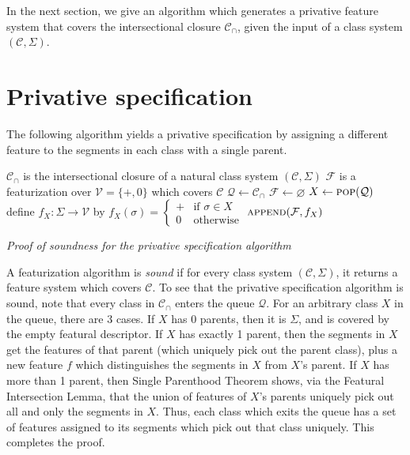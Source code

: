 \documentclass[11pt, oneside]{article}   	%
\begin{document}
In the next section, we give an algorithm which generates a privative feature system that covers the intersectional closure $\mathcal C_\cap$, given the input of a class system $(\mathcal C, \Sigma)$.

 \section{Privative specification}

The following algorithm yields a privative specification by assigning a different feature  to the segments in each class with a single parent.
 
\noindent \begin{algorithmic}
    \REQUIRE $\mathcal C_\cap$ is the intersectional closure of a natural class system $(\mathcal C, \Sigma)$
    \ENSURE $\mathcal F$ is a featurization over $\mathcal V = \{ +, 0 \}$ which covers $\mathcal C$
    \STATE
    \STATE $\mathcal Q \leftarrow \mathcal C_\cap$
    \STATE $\mathcal F \leftarrow \varnothing$
    \STATE
        \STATE $X \leftarrow \textsc{pop}(\mathcal Q)$
            \STATE define $f_X : \Sigma \rightarrow \mathcal V$ by $f_X(\sigma) = \begin{cases}
                + & \mbox{if } \sigma \in X \\
                0 & \mbox{otherwise}
                \end{cases} $
            \STATE $\textsc{append}(\mathcal F, f_X)$
        \ENDIF
    \ENDWHILE
\end{algorithmic}

\vspace{\baselineskip} \noindent \textit{Proof of soundness for the privative specification algorithm}

A featurization algorithm is \textit{sound} if for every class system $(\mathcal C, \Sigma)$, it returns a feature system which covers $\mathcal C$. To see that the privative specification algorithm is sound, note that every class in $\mathcal C_\cap$ enters the queue $\mathcal Q$. For an arbitrary class $X$ in the queue, there are 3 cases. If $X$ has 0 parents, then it is $\Sigma$, and is covered by the empty featural descriptor. If $X$ has exactly 1 parent, then the segments in $X$ get the features of that parent (which uniquely pick out the parent class), plus a new feature $f$ which distinguishes the segments in $X$ from $X$'s parent. If $X$ has more than 1 parent, then Single Parenthood Theorem shows, via the Featural Intersection Lemma, that the union of features of $X$'s parents uniquely pick out all and only the segments in $X$. Thus, each class which exits the queue has a set of features assigned to its segments which pick out that class uniquely. This completes the proof.
\end{document}

